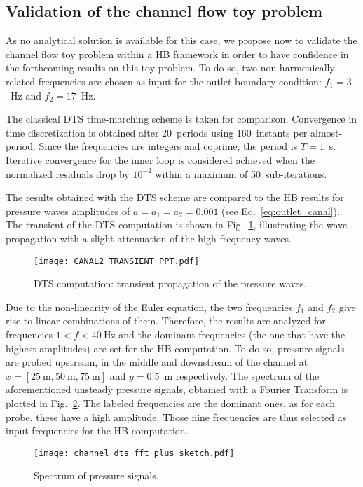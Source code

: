 \subsection{Validation of the channel flow toy problem}
\label{sec:channel_multifreq}

As no analytical solution is available for this case, we propose
now to validate the channel flow toy problem within a HB framework
in order to have confidence in the forthcoming results on this
toy problem.
To do so, two non-harmonically related
frequencies are chosen as input for the outlet boundary condition:
$f_1 = 3$~Hz and $f_2 = 17$~Hz.

The classical DTS time-marching scheme is taken for comparison.
Convergence in time discretization is obtained after 20~periods using
160~instants per almost-period. Since the frequencies are integers and
coprime, the period is $T=1$~s.  Iterative convergence for the
inner loop is considered achieved when the normalized residuals drop
by $10^{-2}$ within a maximum of 50~sub-iterations.

The results obtained with the DTS scheme are compared to the HB
results for pressure waves amplitudes of $a = a_1 = a_2 = 0.001$
(see Eq.~\eqref{eq:outlet_canal}).  The
transient of the DTS computation is shown in
Fig.~\ref{fig:canal2_transient}, illustrating the wave propagation
with a slight attenuation of the high-frequency waves.
\begin{figure}[htb]
  \centering
  \texttt{[image: CANAL2\_TRANSIENT\_PPT.pdf]}
  \caption{DTS computation: transient propagation of the pressure waves.}
  \label{fig:canal2_transient}
\end{figure}

Due to the non-linearity of the Euler equation, the two frequencies
$f_1$ and $f_2$ give rise to linear combinations of them.
Therefore, the results are analyzed for frequencies $1<f< 40~\textrm{Hz}$ and the
dominant frequencies (the one that have the highest amplitudes) are
set for the HB computation.  To do so, pressure signals are probed
upstream, in the middle and downstream of the channel at
$x=[25~\textrm{m}, 50~\textrm{m}, 75~\textrm{m}]$ and $y=0.5$~m
respectively.  The spectrum of the aforementioned unsteady pressure
signals, obtained with a Fourier Transform is plotted in
Fig.~\ref{fig:canal2_dts_fft}.  The labeled frequencies are the
dominant ones, as for each probe, these have a high amplitude. Those
nine frequencies are thus selected as input frequencies for the HB computation.
\begin{figure}[htb]
  \centering
  \texttt{[image: channel\_dts\_fft\_plus\_sketch.pdf]}
  \caption{Spectrum of pressure signals.}
  \label{fig:canal2_dts_fft}
\end{figure}

